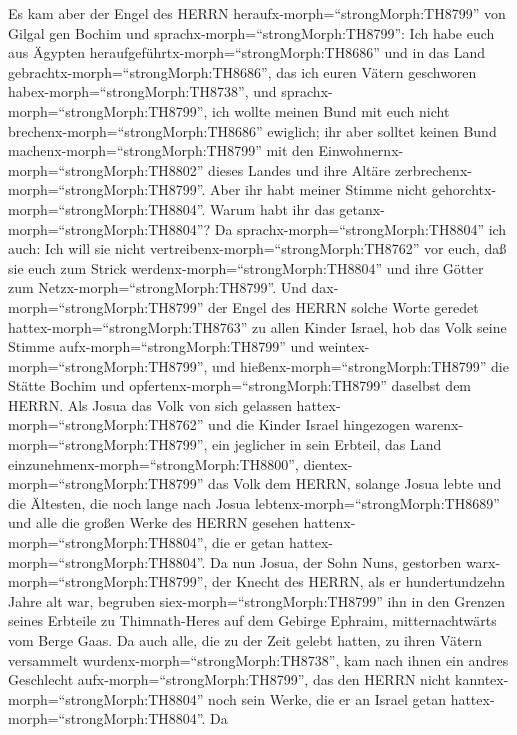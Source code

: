  Es kam aber der Engel des HERRN
heraufx-morph=``strongMorph:TH8799'' von Gilgal gen Bochim und
sprachx-morph=``strongMorph:TH8799'': Ich habe euch aus Ägypten
heraufgeführtx-morph=``strongMorph:TH8686'' und in das Land
gebrachtx-morph=``strongMorph:TH8686'', das ich euren Vätern geschworen
habex-morph=``strongMorph:TH8738'', und
sprachx-morph=``strongMorph:TH8799'', ich wollte meinen Bund mit euch
nicht brechenx-morph=``strongMorph:TH8686'' ewiglich;  ihr
aber solltet keinen Bund machenx-morph=``strongMorph:TH8799'' mit den
Einwohnernx-morph=``strongMorph:TH8802'' dieses Landes und ihre Altäre
zerbrechenx-morph=``strongMorph:TH8799''. Aber ihr habt meiner Stimme
nicht gehorchtx-morph=``strongMorph:TH8804''. Warum habt ihr das
getanx-morph=``strongMorph:TH8804''?  Da
sprachx-morph=``strongMorph:TH8804'' ich auch: Ich will sie nicht
vertreibenx-morph=``strongMorph:TH8762'' vor euch, daß sie euch zum
Strick werdenx-morph=``strongMorph:TH8804'' und ihre Götter zum
Netzx-morph=``strongMorph:TH8799''.  Und
dax-morph=``strongMorph:TH8799'' der Engel des HERRN solche Worte
geredet hattex-morph=``strongMorph:TH8763'' zu allen Kinder Israel, hob
das Volk seine Stimme aufx-morph=``strongMorph:TH8799'' und
weintex-morph=``strongMorph:TH8799'',  und
hießenx-morph=``strongMorph:TH8799'' die Stätte Bochim und
opfertenx-morph=``strongMorph:TH8799'' daselbst dem HERRN. 
Als Josua das Volk von sich gelassen hattex-morph=``strongMorph:TH8762''
und die Kinder Israel hingezogen warenx-morph=``strongMorph:TH8799'',
ein jeglicher in sein Erbteil, das Land
einzunehmenx-morph=``strongMorph:TH8800'', 
dientex-morph=``strongMorph:TH8799'' das Volk dem HERRN, solange Josua
lebte und die Ältesten, die noch lange nach Josua
lebtenx-morph=``strongMorph:TH8689'' und alle die großen Werke des HERRN
gesehen hattenx-morph=``strongMorph:TH8804'', die er getan
hattex-morph=``strongMorph:TH8804''.  Da nun Josua, der Sohn
Nuns, gestorben warx-morph=``strongMorph:TH8799'', der Knecht des HERRN,
als er hundertundzehn Jahre alt war,  begruben
siex-morph=``strongMorph:TH8799'' ihn in den Grenzen seines Erbteile zu
Thimnath-Heres auf dem Gebirge Ephraim, mitternachtwärts vom Berge Gaas.
 Da auch alle, die zu der Zeit gelebt hatten, zu ihren
Vätern versammelt wurdenx-morph=``strongMorph:TH8738'', kam nach ihnen
ein andres Geschlecht aufx-morph=``strongMorph:TH8799'', das den HERRN
nicht kanntex-morph=``strongMorph:TH8804'' noch sein Werke, die er an
Israel getan hattex-morph=``strongMorph:TH8804''.  Da
